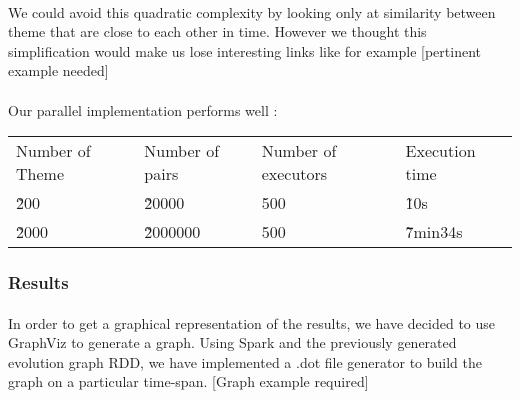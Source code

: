 \paragraph{}
We could avoid this quadratic complexity by looking only at similarity between theme that are close to each other in time. However we thought this simplification would make us lose interesting links like for example [pertinent example needed]

\paragraph{}
Our parallel implementation performs well :
\newline
\begin{tabular}{llll}
Number of Theme & Number of pairs & Number of executors & Execution time \\
\~ 200 & \~ 20000 & 500 & \~ 10s \\
\~ 2000 & \~ 2000000 & 500 & \~ 7min34s \\
\end{tabular}

\subsubsection{Results}
\label{sec:EvoGraphResults}

\paragraph{}
In order to get a graphical representation of the results, we have decided to use GraphViz to generate a graph. Using Spark and the previously generated evolution graph RDD, we have implemented a .dot file generator to build the graph on a particular time-span.
[Graph example required]
